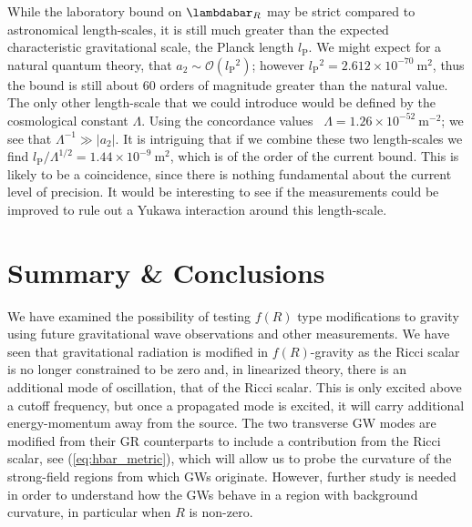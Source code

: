 \documentclass[aps,prd,amsfonts,amssymb,amsmath,nofootinbib,reprint,showpacs]{revtex4-1}
\newcommand{\eqnref}[1]{(\ref{eq:#1})}
\newcommand{\units}[1]{\ensuremath{~\mathrm{#1}}}
\newcommand{\sub}[1]{\ensuremath{_\text{#1}}}
\newcommand{\order}[1]{\ensuremath{\mathcal{O}({#1})}}
\begin{document}
While the laboratory bound on $\lambdabar_R$ may be strict compared to astronomical length-scales, it is still much greater than the expected characteristic gravitational scale, the Planck length $l\sub{P}$. We might expect for a natural quantum theory, that $a_2 \sim \order{l\sub{P}^2}$; however $l\sub{P}^2 = 2.612 \times 10^{-70}\units{m^2}$, thus the bound is still about $60$ orders of magnitude greater than the natural value. The only other length-scale that we could introduce would be defined by the cosmological constant $\Lambda$. Using the concordance values~\cite{Jarosik2011} $\Lambda = 1.26 \times 10^{-52}\units{m^{-2}}$; we see that $\Lambda^{-1} \gg |a_2|$. It is intriguing that if we combine these two length-scales we find ${l\sub{P}}/{\Lambda^{1/2}} = 1.44 \times 10^{-9}\units{m^2}$, which is of the order of the current bound. This is likely to be a coincidence, since there is nothing fundamental about the current level of precision. It would be interesting to see if the measurements could be improved to rule out a Yukawa interaction around this length-scale.

\section{Summary \& Conclusions\label{sec:f_Discuss}}

We have examined the possibility of testing $f(R)$ type modifications to gravity using future gravitational wave observations and other measurements. We have seen that gravitational radiation is modified in $f(R)$-gravity as the Ricci scalar is no longer constrained to be zero and, in linearized theory, there is an additional mode of oscillation, that of the Ricci scalar. This is only excited above a cutoff frequency, but once a propagated mode is excited, it will carry additional energy-momentum away from the source. The two transverse GW modes are modified from their GR counterparts to include a contribution from the Ricci scalar, see \eqnref{hbar_metric}, which will allow us to probe the curvature of the strong-field regions from which GWs originate. However, further study is needed in order to understand how the GWs behave in a region with background curvature, in particular when $R$ is non-zero.
\end{document}
